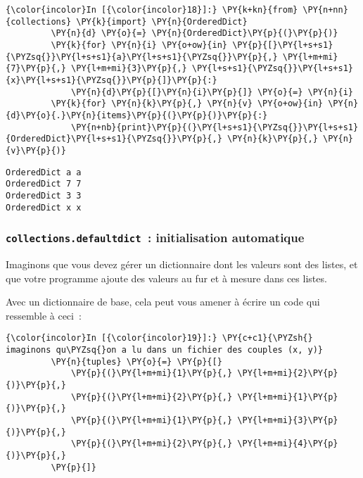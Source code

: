     \begin{Verbatim}[commandchars=\\\{\},frame=single,framerule=0.3mm,rulecolor=\color{cellframecolor}]
{\color{incolor}In [{\color{incolor}18}]:} \PY{k+kn}{from} \PY{n+nn}{collections} \PY{k}{import} \PY{n}{OrderedDict}
         \PY{n}{d} \PY{o}{=} \PY{n}{OrderedDict}\PY{p}{(}\PY{p}{)}
         \PY{k}{for} \PY{n}{i} \PY{o+ow}{in} \PY{p}{[}\PY{l+s+s1}{\PYZsq{}}\PY{l+s+s1}{a}\PY{l+s+s1}{\PYZsq{}}\PY{p}{,} \PY{l+m+mi}{7}\PY{p}{,} \PY{l+m+mi}{3}\PY{p}{,} \PY{l+s+s1}{\PYZsq{}}\PY{l+s+s1}{x}\PY{l+s+s1}{\PYZsq{}}\PY{p}{]}\PY{p}{:}
             \PY{n}{d}\PY{p}{[}\PY{n}{i}\PY{p}{]} \PY{o}{=} \PY{n}{i}
         \PY{k}{for} \PY{n}{k}\PY{p}{,} \PY{n}{v} \PY{o+ow}{in} \PY{n}{d}\PY{o}{.}\PY{n}{items}\PY{p}{(}\PY{p}{)}\PY{p}{:}
             \PY{n+nb}{print}\PY{p}{(}\PY{l+s+s1}{\PYZsq{}}\PY{l+s+s1}{OrderedDict}\PY{l+s+s1}{\PYZsq{}}\PY{p}{,} \PY{n}{k}\PY{p}{,} \PY{n}{v}\PY{p}{)}
\end{Verbatim}


    \begin{Verbatim}[commandchars=\\\{\},frame=single,framerule=0.3mm,rulecolor=\color{cellframecolor}]
OrderedDict a a
OrderedDict 7 7
OrderedDict 3 3
OrderedDict x x
\end{Verbatim}

    \hypertarget{collections.defaultdict-initialisation-automatique}{%
\subsubsection{\texorpdfstring{\texttt{collections.defaultdict}~:
initialisation
automatique}{collections.defaultdict~: initialisation automatique}}\label{collections.defaultdict-initialisation-automatique}}

    Imaginons que vous devez gérer un dictionnaire dont les valeurs sont des
listes, et que votre programme ajoute des valeurs au fur et à mesure
dans ces listes.

Avec un dictionnaire de base, cela peut vous amener à écrire un code qui
ressemble à ceci~:

    \begin{Verbatim}[commandchars=\\\{\},frame=single,framerule=0.3mm,rulecolor=\color{cellframecolor}]
{\color{incolor}In [{\color{incolor}19}]:} \PY{c+c1}{\PYZsh{} imaginons qu\PYZsq{}on a lu dans un fichier des couples (x, y)}
         \PY{n}{tuples} \PY{o}{=} \PY{p}{[}
             \PY{p}{(}\PY{l+m+mi}{1}\PY{p}{,} \PY{l+m+mi}{2}\PY{p}{)}\PY{p}{,}
             \PY{p}{(}\PY{l+m+mi}{2}\PY{p}{,} \PY{l+m+mi}{1}\PY{p}{)}\PY{p}{,}
             \PY{p}{(}\PY{l+m+mi}{1}\PY{p}{,} \PY{l+m+mi}{3}\PY{p}{)}\PY{p}{,}
             \PY{p}{(}\PY{l+m+mi}{2}\PY{p}{,} \PY{l+m+mi}{4}\PY{p}{)}\PY{p}{,}
         \PY{p}{]}
\end{Verbatim}


